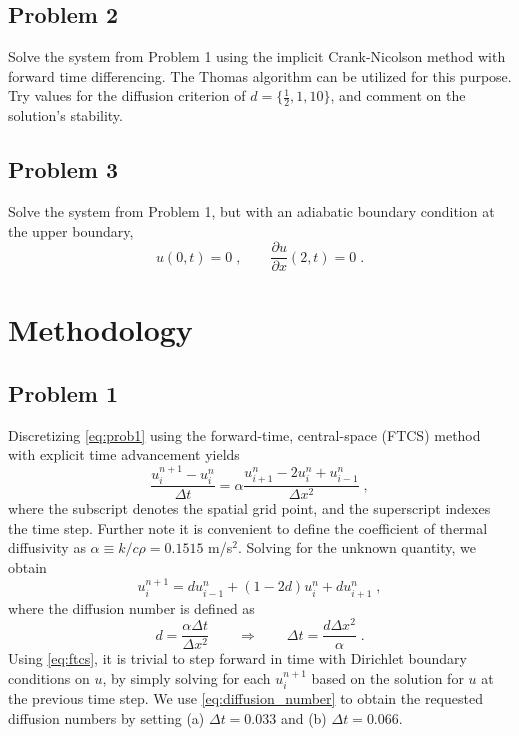 \documentclass[11pt]{article}
\begin{document}
\subsection{Problem 2}

Solve the system from Problem 1 using the implicit Crank-Nicolson method with forward time differencing. The Thomas algorithm can be utilized for this purpose. Try values for the diffusion criterion of $d = \{\tfrac{1}{2}, 1, 10\}$, and comment on the solution's stability.

\subsection{Problem 3}

Solve the system from Problem 1, but with an adiabatic boundary condition at the upper boundary,
\begin{equation}
u(0,t) = 0 \;, \qquad \frac{\partial u}{\partial x}(2,t) = 0
\;.
\label{eq:prob3}
\end{equation}

\section{Methodology} %

\subsection{Problem 1}

Discretizing \eqref{eq:prob1} using the forward-time, central-space (FTCS) method with explicit time advancement yields
\begin{equation}
\frac{u_i^{n+1} - u_i^n}{\Delta t} = \alpha \frac{u_{i+1}^n - 2u_i^n + u_{i-1}^n}{\Delta x^2}
\;,
\end{equation}
where the subscript denotes the spatial grid point, and the superscript indexes the time step. Further note it is convenient to define the coefficient of thermal diffusivity as $\alpha \equiv k / c \rho = 0.1515$ m/s$^2$. Solving for the unknown quantity, we obtain
\begin{equation}
u_i^{n+1} = d u_{i-1}^n + (1-2d) u_i^n + d u_{i+1}^n
\;,
\label{eq:ftcs}
\end{equation}
where the diffusion number is defined as
\begin{equation}
d = \frac{\alpha \Delta t}{\Delta x^2} 
\qquad \Rightarrow \qquad
\Delta t = \frac{d \Delta x^2}{\alpha}
\;.
\label{eq:diffusion_number}
\end{equation}
Using \eqref{eq:ftcs}, it is trivial to step forward in time with Dirichlet boundary conditions on $u$, by simply solving for each $u_i^{n+1}$ based on the solution for $u$ at the previous time step. We use \eqref{eq:diffusion_number} to obtain the requested diffusion numbers by setting (a) $\Delta t = 0.033$ and (b) $\Delta t = 0.066$.
\end{document}
